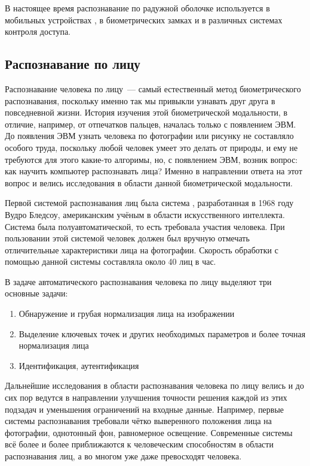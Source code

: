 \documentclass[14pt, a4paper]{extarticle}
\begin{document}
В настоящее время распознавание по радужной оболочке используется в мобильных устройствах \cite{odinokikh2018high}, в биометрических замках и в различных системах контроля доступа.

\subsection{Распознавание по лицу}
Распознавание человека по лицу~--- самый естественный метод биометрического распознавания, поскольку именно так мы привыкли узнавать друг друга в повседневной жизни. История изучения этой биометрической модальности, в отличие, например, от отпечатков пальцев, началась только с появлением ЭВМ. До появления ЭВМ узнать человека по фотографии или рисунку не составляло особого труда, поскольку любой человек умеет это делать от природы, и ему не требуются для этого какие-то алгоримы, но, с появлением ЭВМ, возник вопрос: как научить компьютер распознавать лица? Именно в направлении ответа на этот вопрос и велись исследования в области данной биометрической модальности.

Первой системой распознавания лиц была система \cite{bledsoe1968face}, разработанная в 1968 году Вудро Бледсоу, американским учёным в области искусственного интеллекта. Система была полуавтоматической, то есть требовала участия человека. При пользовании этой системой человек должен был вручную отмечать отличительные характеристики лица на фотографии. Скорость обработки с помощью данной системы составляла около 40 лиц в час.

В задаче автоматического распознавания человека по лицу выделяют три основные задачи:
\begin{enumerate}
	\item Обнаружение и грубая нормализация лица на изображении
	\item Выделение ключевых точек и других необходимых параметров и более точная нормализация лица
	\item Идентификация, аутентификация
\end{enumerate}

Дальнейшие исследования в области распознавания человека по лицу велись и до сих пор ведутся в направлении улучшения точности решения каждой из этих подзадач и уменьшения ограничений на входные данные. Например, первые системы распознавания требовали чётко выверенного положения лица на фотографии, однотонный фон, равномерное освещение. Современные системы всё более и более приближаются к человеческим способностям в области распознавания лиц, а во многом уже даже превосходят человека.
\end{document}
